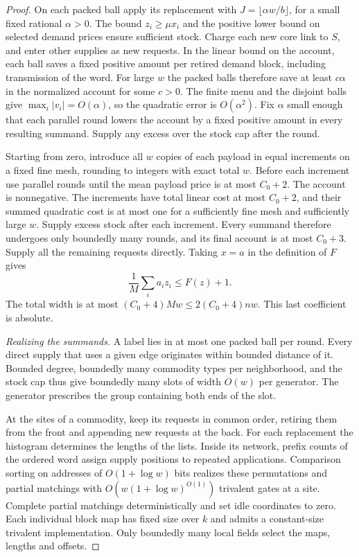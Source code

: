 \begin{proof}
On each packed ball apply its replacement with
$J=\lfloor\alpha w/b\rfloor$, for a small fixed rational $\alpha>0$.
The bound $z_i\ge\mu x_i$ and the positive lower bound on selected
demand prices ensure sufficient stock. Charge each new core link to
$S$, and enter other supplies as new requests. In the linear bound on
the account, each ball saves a fixed positive amount per retired demand
block, including transmission of the word. For large $w$ the packed
balls therefore save at least $c\alpha$ in the normalized account for
some $c>0$. The finite menu and the disjoint balls give
$\max_i|v_i|=O(\alpha)$, so the quadratic error is $O(\alpha^2)$.
Fix $\alpha$ small enough that each parallel round lowers the account
by a fixed positive amount in every resulting summand. Supply any
excess over the stock cap after the round.

Starting from zero, introduce all $w$ copies of each payload in equal
increments on a fixed fine mesh, rounding to integers with exact total
$w$. Before each increment use parallel rounds until the mean payload
price is at most $C_0+2$. The account is nonnegative. The increments
have total linear cost at most $C_0+2$, and their summed quadratic
cost is at most one for a sufficiently fine mesh and sufficiently
large $w$. Supply excess stock after each increment. Every summand
therefore undergoes only boundedly many rounds, and its final account
is at most $C_0+3$. Supply all the remaining requests directly.
Taking $x=a$ in the definition of $F$ gives
\[
             \frac1M\sum_i a_i z_i\le F(z)+1.
\]
The total width is at most $(C_0+4)Mw\le 2(C_0+4)nw$. This last
coefficient is absolute.

\smallskip\noindent
\emph{Realizing the summands.}
A label lies in at most one packed ball per round. Every direct
supply that uses a given edge originates within bounded distance of
it. Bounded degree, boundedly many commodity types per neighborhood,
and the stock cap thus give boundedly many slots of width $O(w)$
per generator. The generator prescribes the group containing both
ends of the slot.

At the sites of a commodity, keep its requests in common order,
retiring them from the front and appending new requests at the back.
For each replacement the histogram determines the lengths of the
lists. Inside its network, prefix counts of the ordered word assign
supply positions to repeated applications. Comparison sorting on
addresses of $O(1+\log w)$ bits realizes these permutations and
partial matchings with $O(w(1+\log w)^{O(1)})$ trivalent gates at a
site. Complete partial matchings deterministically and set idle
coordinates to zero. Each individual block map has fixed size over
$k$ and admits a constant-size trivalent implementation. Only
boundedly many local fields select the maps, lengths and offsets.


\end{proof}
